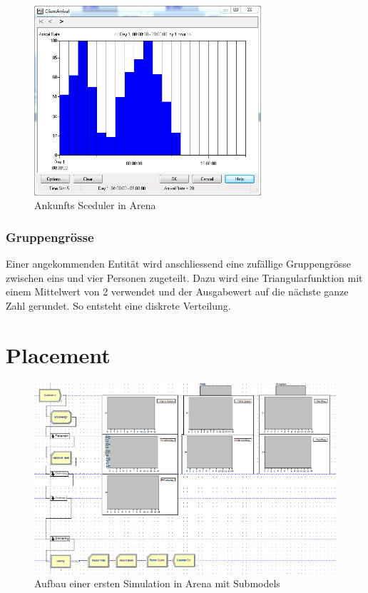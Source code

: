 \documentclass[ngerman,a4paper,12pt]{scrreprt}
\begin{document}
			\begin{figure}[H]
				\centering
					\includegraphics[trim=0.35cm 1.75cm 1cm 1.75cm, clip=true,width=0.75\textwidth]{img/scheduler.png}
					\caption[Arrival Sceduler in Arena]{Ankunfts Sceduler in Arena}
					\label{arrivalSceduler}
			\end{figure}
	
			\subsubsection{Gruppengrösse}
			Einer angekommenden Entität wird anschliessend eine zufällige Gruppengrösse zwischen eins und vier Personen zugeteilt. Dazu wird eine Triangularfunktion mit einem Mittelwert von 2 verwendet und der Ausgabewert auf die nächste ganze Zahl gerundet. So entsteht eine diskrete Verteilung.
			
	
	\section{Placement}
		\begin{figure}[H]
			\centering
				\includegraphics[width=\textwidth]{img/arena.png}
				\caption[Simulationsaufbau in Arena]{Aufbau einer ersten Simulation in Arena mit Submodels}
				\label{arenaSimulationsAufbau}
		\end{figure}
		
\end{document}
